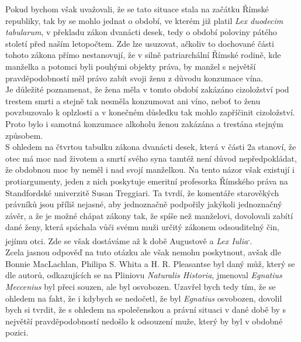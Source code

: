 \documentclass{article}
\begin{document}
Pokud bychom však uvažovali, že se tato situace stala na začátku Římské republiky, tak by se mohlo jednat o období, ve kterém již platil \textit{Lex duodecim tabularum}, v překladu zákon dvanácti desek, tedy o období poloviny pátého století před naším letopočtem. Zde lze usuzovat, ačkoliv to dochované části tohoto zákona přímo nestanovují, že v silně patriarchální Římské rodině, kde manželka a potomci byli pouhými objekty práva, by manžel s největší pravděpodobností měl právo zabít svoji ženu z důvodu konzumace vína.\\

Je důležité poznamenat, že žena měla v tomto období zakázáno cizoložství pod trestem smrti a stejně tak nesměla konzumovat ani víno, neboť to ženu povzbuzovalo k oplzlosti a v konečném důsledku tak mohlo zapříčinit cizoložství. Proto bylo i samotná konzumace alkoholu ženou zakázána a trestána stejným způsobem.\\

S ohledem na čtvrtou tabulku zákona dvanácti desek, která v části 2a stanoví, že otec má moc nad životem a smrtí svého syna tamtéž není důvod nepředpokládat, že obdobnou moc by neměl i nad svojí manželkou. Na tento názor však existují i protiargumenty, jeden z nich poskytuje emeritní profesorka Římského práva na Standfordské univerzitě Susan Treggiari. Ta tvrdí, že komentáře starověkých právníků jsou příliš nejasné, aby jednoznačně podpořily jakýkoli jednoznačný závěr, a že je možné chápat zákony tak, že spíše než manželovi, dovolovali zabítí dané ženy, která spáchala vůči svému muži určitý zákonem odsouditelný čin, jejímu otci. Zde se však dostáváme až k době Augustově a \textit{Lex Iulia}\textsuperscript{,}.\\

Zcela jasnou odpověď na tuto otázku ale však nemohu poskytnout, avšak dle Bonnie MacLachlan, Philipa S. Whita a H. R. Pleasantse byl daný můž, který se dle autorů, odkazujících se na Pliniovu \textit{Naturalis Historia}, jmenoval \textit{Egnatius Meccenius} byl přeci souzen, ale byl osvobozen. Uzavřel bych tedy tím, že se ohledem na fakt, že i kdybych se nedočetl, že byl \textit{Egnatius} osvobozen, dovolil bych si tvrdit, že s ohledem na společenskou a právní situaci v dané době by s největší pravděpodobností nedošlo k odsouzení muže, který by byl v obdobné pozici.
\end{document}
